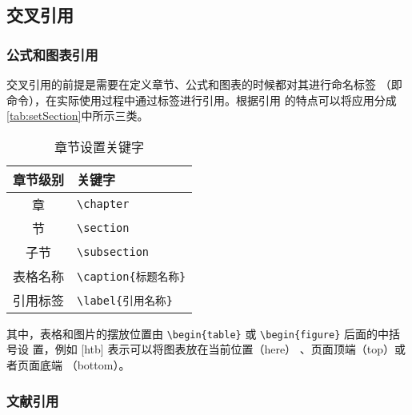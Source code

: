 \subsection{交叉引用}

\subsubsection{公式和图表引用}

交叉引用的前提是需要在定义章节、公式和图表的时候都对其进行命名标签
（即\label{sec:labelName} 命令），在实际使用过程中通过标签进行引用。根据引用
的特点可以将应用分成\autoref{tab:setSection}中所示三类。

\begin{table}[htb]
 \centering
  \caption{章节设置关键字}     %
  \label{tab:setSection}    %
  \begin{tabular}{cl}
    \toprule
    章节级别        & 关键字     \\
    \midrule
     章        & \verb|\chapter| \\
     节        & \verb|\section | \\
    子节      & \verb|\subsection |\\
    表格名称       & \verb|\caption{标题名称}| \\
    引用标签       & \verb|\label{引用名称}| \\
    \bottomrule
  \end{tabular}
\end{table}


其中，表格和图片的摆放位置由 \verb|\begin{table}| 或 \verb|\begin{figure}| 后面的中括号设
置，例如 [htb] 表示可以将图表放在当前位置（here）
、页面顶端（top）或者页面底端
（bottom）。

\subsubsection{文献引用}

